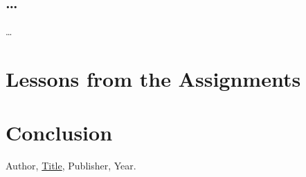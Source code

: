 \documentclass{article}
\theoremstyle{theorem}
\theoremstyle{definition}
\theoremstyle{remark}
\begin{document}
\subsection{\ldots} 

\ldots

\section{Lessons from the Assignments}





\section{Conclusion}\label{conclusion}


\begin{thebibliography}{99}
 Author, \href{https://en.wikipedia.org/wiki/LaTeX}{Title}, Publisher, Year.
\end{thebibliography}
\end{document}
